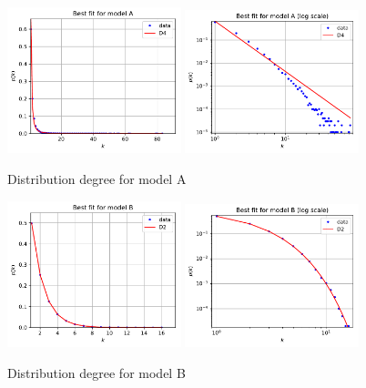 \documentclass[a4paper]{article}
\begin{document}
\newpage

\begin{figure}[H]
		\centering
		\includegraphics[width=0.45\textwidth]{modelA/best_dd.pdf}
		\includegraphics[width=0.45\textwidth]{modelA/best_log_dd.pdf}
		\caption{Distribution degree for model A}
		\label{fig:best_dd_A}
\end{figure}
%
\begin{figure}[H]
		\centering
		\includegraphics[width=0.45\textwidth]{modelB/best_dd.pdf}
		\includegraphics[width=0.45\textwidth]{modelB/best_log_dd.pdf}
		\caption{Distribution degree for model B}
		\label{fig:best_dd_B}
\end{figure}
\end{document}
